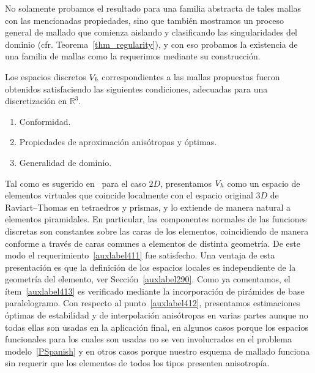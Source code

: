 No solamente probamos el resultado para una familia abstracta
de tales mallas con las mencionadas propiedades,
 sino que también mostramos un proceso general de mallado
 que comienza aislando y clasificando las singularidades
del dominio (cfr. Teorema~\ref{thm_regularity}), y
con eso probamos la existencia de una familia de mallas
como la requerimos mediante su construcción.

Los espacios discretos $V_{\textit h}$ correspondientes
a las mallas propuestas fueron obtenidos satisfaciendo
las siguientes condiciones, adecuadas para una discretización
en $\mathbb{R}^3$.
\begin{enumerate}
	\item \label{auxlabel411} Conformidad.
	\item \label{auxlabel412} Propiedades de aproximación anisótropas y óptimas.
	\item \label{auxlabel413} Generalidad de dominio.
\end{enumerate}
Tal como es sugerido en~\cite{bfm} para el caso $2D$,
presentamos $V_{\textit h}$ como un espacio de elementos 
virtuales que coincide localmente con el espacio original
$3D$ de Raviart--Thomas en tetraedros y prismas, y lo
extiende de manera natural a elementos piramidales. 
En particular, las componentes normales de las
funciones discretas son constantes sobre las caras de
los elementos, coincidiendo de manera conforme a través 
de caras comunes a elementos de distinta geometría. De
este modo el requerimiento~\ref{auxlabel411} fue satisfecho.
Una ventaja de esta presentación es que la definición
de los espacios locales es independiente de la geometría 
del elemento, ver Sección~\ref{auxlabel290}. Como ya comentamos,
el \'item~\ref{auxlabel413} es verificado mediante la 
incorporación de pirámides de base paralelogramo.
Con respecto al punto~\ref{auxlabel412}, presentamos
estimaciones óptimas de estabilidad y de interpolación
anisótropas en varias partes aunque no todas ellas
son usadas en la aplicación final, en algunos casos
porque los espacios funcionales para los cuales son usadas
no se ven involucrados en el problema 
modelo~\eqref{PSpanish} y en otros casos porque
nuestro esquema de mallado funciona sin requerir
que los elementos de todos los tipos presenten 
anisotropía.

